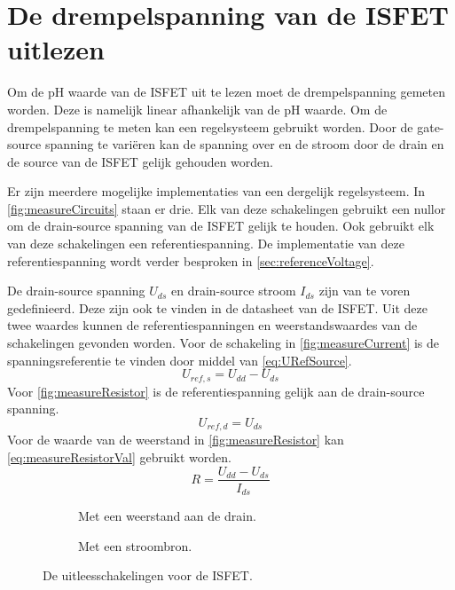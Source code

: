 \section{De drempelspanning van de ISFET uitlezen}

Om de pH waarde van de ISFET uit te lezen moet de drempelspanning gemeten worden. Deze is namelijk linear afhankelijk van de pH waarde.
Om de drempelspanning te meten kan een regelsysteem gebruikt worden. Door de gate-source spanning te variëren kan de spanning over en de stroom door de drain en de source van de ISFET gelijk gehouden worden.

Er zijn meerdere mogelijke implementaties van een dergelijk regelsysteem. In \autoref{fig:measureCircuits} staan er drie.
Elk van deze schakelingen gebruikt een nullor om de drain-source spanning van de ISFET gelijk te houden. Ook gebruikt elk van deze schakelingen een referentiespanning. De implementatie van deze referentiespanning wordt verder besproken in \autoref{sec:referenceVoltage}.

De drain-source spanning $U_{ds}$ en drain-source stroom $I_{ds}$ zijn van te voren gedefinieerd. Deze zijn ook te vinden in de datasheet van de ISFET\cite{isfet}. Uit deze twee waardes kunnen de referentiespanningen en weerstandswaardes van de schakelingen gevonden worden.
Voor de schakeling in \autoref{fig:measureCurrent} is de spanningsreferentie te vinden door middel van \autoref{eq:URefSource}.
\begin{equation}\label{eq:URefSource}
    U_{ref,s} = U_{dd} - U_{ds}
\end{equation}
Voor \autoref{fig:measureResistor} is de referentiespanning gelijk aan de drain-source spanning.
\begin{equation}\label{eq:URefDrain}
    U_{ref,d} = U_{ds}
\end{equation}
Voor de waarde van de weerstand in \autoref{fig:measureResistor} kan \autoref{eq:measureResistorVal} gebruikt worden.
\begin{equation}\label{eq:measureResistorVal}
    R = \frac{U_{dd} - U_{ds}}{I_{ds}}
\end{equation}


\begin{figure}[ht]
    \centering
    \begin{subfigure}[b]{0.45\textwidth}
        \centering
        \def\svgwidth{\textwidth}
        
        \caption{Met een weerstand aan de drain.}
        \label{fig:measureResistor}
    \end{subfigure}
    \hfill
    \begin{subfigure}[b]{0.45\textwidth}
        \centering
        \def\svgwidth{\textwidth}
        
        \caption{Met een stroombron.}
        \label{fig:measureCurrent}
    \end{subfigure}
    \caption{De uitleesschakelingen voor de ISFET.}
    \label{fig:measureCircuits}
\end{figure}


